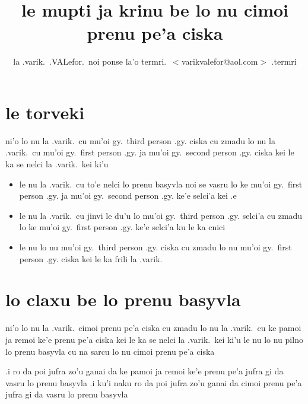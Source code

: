 \documentclass{article}
\title{le mupti ja krinu be lo nu cimoi prenu pe'a ciska}
\author{la .varik.\ .VALefor.\ noi ponse la'o termri.\ $<$varikvalefor@aol.com$>$ .termri}
\begin{document}
\maketitle

\section{le torveki}
ni'o lo nu la .varik.\ cu mu'oi gy.\ third person .gy. ciska cu zmadu lo nu la .varik.\ cu mu'oi gy.\ first person .gy. ja mu'oi gy.\ second person .gy. ciska kei le ka se nelci la .varik.\ kei ki'u
\begin{itemize}
	\item le nu la .varik.\ cu to'e nelci lo prenu basyvla noi se vasru lo ke mu'oi gy.\ first person .gy. ja mu'oi gy.\ second person .gy. ke'e selci'a kei .e
	\item le nu la .varik.\ cu jinvi le du'u lo mu'oi gy.\ third person .gy. selci'a cu zmadu lo ke mu'oi gy.\ first person .gy. ke'e selci'a ku le ka cnici
	\item le nu lo nu mu'oi gy.\ third person .gy. ciska cu zmadu lo nu mu'oi gy.\ first person .gy. ciska kei le ka frili la .varik.
\end{itemize}

\section{lo claxu be lo prenu basyvla}
ni'o lo nu la .varik.\ cimoi prenu pe'a ciska cu zmadu lo nu la .varik.\ cu ke pamoi ja remoi ke'e prenu pe'a ciska kei le ka se nelci la .varik.\ kei ki'u le nu lo nu pilno lo prenu basyvla cu na sarcu lo nu cimoi prenu pe'a ciska

.i ro da poi jufra zo'u ganai da ke pamoi ja remoi ke'e prenu pe'a jufra gi da vasru lo prenu basyvla  .i ku'i naku ro da poi jufra zo'u ganai da cimoi prenu pe'a jufra gi da vasru lo prenu basyvla
\end{document}
